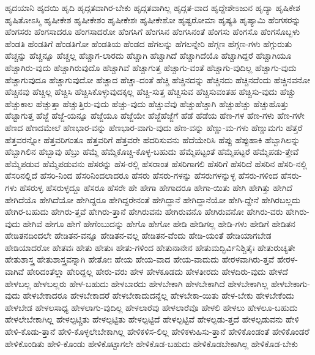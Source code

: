 {ಹೃದಯಾನಿ
ಹೃದಯಿ
ಹೃದಿ
ಹೃದ್ಗತವಾಗಿರ-ಬೇಕು
ಹೃದ್ಗತವಾಗಿಲ್ಲ
ಹೃದ್ಗತ-ವಾದ
ಹೃದ್ದೇಶೇಽಜುನ
ಹೃದ್ಯಾ
ಹೃಷಿಕೇಶ
ಹೃಷಿತೋಽಸ್ಮಿ
ಹೃಷೀಕೇಶ
ಹೃಷೀಕೇಶಂ
ಹೃಷೀಕೇಶಃ
ಹೃಷೀಕೇಶೋ
ಹೃಷ್ಟರೋಮಾ
ಹೃಷ್ಯತಿ
ಹೃಷ್ಯಾಮಿ
ಹೆಂಗಸರನ್ನು
ಹೆಂಗಸರು
ಹೆಂಗಸಾದರೂ
ಹೆಂಗಸಾದರೋ
ಹೆಂಗಸಿಗೆ
ಹೆಂಗಸಿನ
ಹೆಂಗಸಿನಂತೆ
ಹೆಂಗಸು
ಹೆಂಗಸೊ
ಹೆಂಗಸೊಬ್ಬಳು
ಹೆಂಡತಿ
ಹೆಂಡತಿಗೆ
ಹೆಂಡತಿಗೋ
ಹೆಂಡತಿಯ
ಹೆಂಡದ
ಹೆಗಲನ್ನು
ಹೆಗಲನ್ನೇರಿ
ಹೆಗ್ಗಣ
ಹೆಗ್ಗಣ-ಗಳು
ಹೆಗ್ಗುರುತು
ಹೆಚ್ಚನ್ನು
ಹೆಚ್ಚನ್ನೂ
ಹೆಚ್ಚಲ್ಲ
ಹೆಚ್ಚಾಗ-ಲಾರದು
ಹೆಚ್ಚಾಗಿ
ಹೆಚ್ಚಾಗಿದೆ
ಹೆಚ್ಚಾಗಿದೆಯೊ
ಹೆಚ್ಚಾಗಿದ್ದರೆ
ಹೆಚ್ಚಾಗಿಯೂ
ಹೆಚ್ಚಾಗಿರು-ವುದು
ಹೆಚ್ಚಾಗಿರುವುದೊ
ಹೆಚ್ಚಾಗಿವೆ
ಹೆಚ್ಚಾಗುತ್ತ
ಹೆಚ್ಚಾಗು-ವಂತೆ
ಹೆಚ್ಚಾಗು-ವುದಿಲ್ಲ
ಹೆಚ್ಚಾಗು-ವುದು
ಹೆಚ್ಚಾಗುವುದೂ
ಹೆಚ್ಚಾಗುವುದೋ
ಹೆಚ್ಚಾದ
ಹೆಚ್ಚಾ-ದಂತೆ
ಹೆಚ್ಚಿ
ಹೆಚ್ಚಿನದನ್ನು
ಹೆಚ್ಚಿನದು
ಹೆಚ್ಚಿನದೆಂದು
ಹೆಚ್ಚಿನವನೋ
ಹೆಚ್ಚಿನವು
ಹೆಚ್ಚಿಲ್ಲ
ಹೆಚ್ಚಿಸಿ
ಹೆಚ್ಚಿಸಿಕೊಳ್ಳುವುದಕ್ಕಲ್ಲ
ಹೆಚ್ಚಿ-ಸುತ್ತ
ಹೆಚ್ಚಿಸುವ
ಹೆಚ್ಚಿಸುವಂತಹ
ಹೆಚ್ಚಿಸು-ವುದು
ಹೆಚ್ಚು
ಹೆಚ್ಚುಕಾಲ
ಹೆಚ್ಚುತ್ತಾ
ಹೆಚ್ಚುತ್ತಿರು-ವುದು
ಹೆಚ್ಚು-ವುದು
ಹೆಚ್ಚುವೆವು
ಹೆಚ್ಚುಹೆಚ್ಚಾಗಿ
ಹೆಚ್ಚುಹೆಚ್ಚು
ಹೆಚ್ಚುಹೊತ್ತು
ಹೆಚ್ಟಾಗುತ್ತ
ಹೆಜ್ಜೆ
ಹೆಜ್ಜೆ-ಯನ್ನೂ
ಹೆಜ್ಜೆಯೂ
ಹೆಜ್ಜೆಯೇ
ಹೆಜ್ಜೆಹೆಜ್ಜೆಗೆ
ಹೆಡೆ
ಹೆಡೆಯ
ಹೆಣ-ಗಳ
ಹೆಣ-ಗಳು
ಹೆಣ-ಗಳೇ
ಹೆಣದ
ಹೆಣದಮೇಲೆ
ಹೆಣಭಾರ-ವನ್ನು
ಹೆಣಭಾರ-ವಾಗು-ವುದು
ಹೆಣ-ವನ್ನು
ಹೆಣ್ಣು-ಮ-ಗಳು
ಹೆಣ್ಣುಮಗು
ಹೆತ್ತರೆ
ಹೆತ್ತವರನ್ನೋ
ಹೆತ್ತವರಿಗಂತೂ
ಹೆತ್ತವರಿಗೆ
ಹೆತ್ತವರೇ
ಹೆದರಿಸುವನು
ಹೆದೆಯೇರಿಸಿ
ಹೆಪ್ಪು
ಹೆಪ್ಪುಹಾಕಿ
ಹೆಬ್ಬಾಗಿಲನ್ನು
ಹೆಬ್ಬಾಗಿಲಿನ
ಹೆಬ್ಬಾವು
ಹೆಬ್ರು
ಹೆಮ್ಮೆ
ಹೆಮ್ಮೆಕೊಚ್ಚಿ-ಕೊಳ್ಳ-ಬಹುದು
ಹೆಮ್ಮೆಪಟ್ಟಂತೆ
ಹೆಮ್ಮೆಪಟ್ಟರೆ
ಹೆಮ್ಮೆಪಡು-ತ್ತೇವೆ
ಹೆಮ್ಮೆಪಡುವ
ಹೆಮ್ಮೆಪಡುವನು
ಹೆಸರನ್ನು
ಹೆಸ-ರಲ್ಲಿ
ಹೆಸರಾಂತ
ಹೆಸರಿಗಾಗಲಿ
ಹೆಸರಿಗೆ
ಹೆಸರಿದೆ
ಹೆಸರಿನ
ಹೆಸರಿ-ನಲ್ಲಿ
ಹೆಸರಿನಲ್ಲಿದೆ
ಹೆಸರಿ-ನಿಂದ
ಹೆಸರಿನಿಂದಲಾದರೂ
ಹೆಸರು
ಹೆಸರು-ಗಳನ್ನು
ಹೆಸರುಗಳನ್ನುಳ್ಳ
ಹೆಸರು-ಗಳಿಂದ
ಹೆಸರು-ಗಳು
ಹೆಸರುಳ್ಳ
ಹೆಸರುಳ್ಳದ್ದೂ
ಹೆಸರೂ
ಹೆಸರೇ
ಹೇ
ಹೇಗಾ
ಹೇಗಾದರೂ
ಹೇಗಾ-ಯಿತು
ಹೇಗಿ
ಹೇಗಿತ್ತು
ಹೇಗಿದೆ
ಹೇಗಿದೆಯೊ
ಹೇಗಿದೆಯೋ
ಹೇಗಿದ್ದರೂ
ಹೇಗಿದ್ದರೇನಂತೆ
ಹೇಗಿದ್ದಾನೆ
ಹೇಗಿದ್ದಾನೆಯೋ
ಹೇಗಿ-ದ್ದೇನೆ
ಹೇಗಿರಬಲ್ಲದು
ಹೇಗಿರ-ಬಹುದು
ಹೇಗಿರು-ತ್ತವೆ
ಹೇಗಿರು-ತ್ತಾನೆ
ಹೇಗಿರುವನು
ಹೇಗಿರುವನೊ
ಹೇಗಿರುವನೋ
ಹೇಗಿರು-ವರು
ಹೇಗಿರು-ವುದು
ಹೇಗಿವೆ
ಹೇಗೂ
ಹೇಗೆ
ಹೇಗೆಂಬುದನ್ನು
ಹೇಗೊ
ಹೇಗೋ
ಹೇಡಿ
ಹೇಡಿಗಲ್ಲ
ಹೇಡಿ-ಗಳು
ಹೇಡಿಗೆ
ಹೇಡಿತನ
ಹೇಡಿತನದಿಂದಲೇ
ಹೇಡಿತನ-ವನ್ನೂ
ಹೇಡಿತನ-ವಲ್ಲ
ಹೇಡಿತನ-ವೆಂದು
ಹೇಡಿ-ಯಂತೆ
ಹೇಡಿಯಾಗಬೇಡ
ಹೇಡಿಯಾದರೋ
ಹೇತವಃ
ಹೇತು
ಹೇತುಃ
ಹೇತು-ಗಳಿಂದ
ಹೇತುನಾನೇನ
ಹೇತುಮದ್ಭಿರ್ವಿನಿಶ್ಚಿತೈಃ
ಹೇತುರುಚ್ಯತೇ
ಹೇತುಶಾಸ್ತ್ರ
ಹೇತುಶಾಸ್ತ್ರವನ್ನಾಗಿ
ಹೇತೋಃ
ಹೇಯ
ಹೇಯ-ವಾದ
ಹೇಯ-ವಾದುದು
ಹೇರಳವಾಗಿರು-ತ್ತವೆ
ಹೇರಳ-ವಾಗಿವೆ
ಹೇರಿದಂತೆಲ್ಲಾ
ಹೇರಿದ್ದಲ್ಲ
ಹೇರು-ವರು
ಹೇಳ
ಹೇಳಕೂಡದು
ಹೇಳತೀರದು
ಹೇಳದಿರು-ವುದು
ಹೇಳದೆ
ಹೇಳಬಲ್ಲ
ಹೇಳಬಲ್ಲರು
ಹೇಳ-ಬಹುದು
ಹೇಳಬಾರದು
ಹೇಳಬೇಕಾಗಿ
ಹೇಳಬೇಕಾಗಿದೆ
ಹೇಳಬೇಕಾಗಿಲ್ಲ
ಹೇಳಬೇಕಾಗು-ವುದು
ಹೇಳಬೇಕಾದರೂ
ಹೇಳಬೇಕಾದರೆ
ಹೇಳಬೇಕಾದುದನ್ನೆಲ್ಲ
ಹೇಳಬೇಕಾ-ಯಿತು
ಹೇಳ-ಬೇಕು
ಹೇಳಬೇಕೆಂದು
ಹೇಳಬೇಡ
ಹೇಳಲಸಾಧ್ಯ
ಹೇಳಲಾಗು-ವುದಿಲ್ಲ
ಹೇಳಲಾರೆವು
ಹೇಳಲಾರೆವೊ
ಹೇಳಲಿ
ಹೇಳಲು
ಹೇಳಲೂ-ಬಹುದು
ಹೇಳಲೇಬೇಕಾಗಿಲ್ಲ
ಹೇಳಲ್ಪಟ್ಚಿತು
ಹೇಳಲ್ಪಟ್ಟಿತು
ಹೇಳಲ್ಪಟ್ಟಿದೆ
ಹೇಳಲ್ಪಟ್ಟಿವೆ
ಹೇಳಲ್ಪಡು-ತ್ತದೆ
ಹೇಳಲ್ಪಡುವನು
ಹೇಳಿ
ಹೇಳಿ-ಕೊಡು-ತ್ತಾನೆ
ಹೇಳಿ-ಕೊಳ್ಳಲೇಬೇಕಾಗಿಲ್ಲ
ಹೇಳಿಕಳಿಸ-ಲಿಲ್ಲ
ಹೇಳಿಕಳುಹಿಸು-ತ್ತಾನೆ
ಹೇಳಿಕೊಂಡಂತೆ
ಹೇಳಿಕೊಂಡರೆ
ಹೇಳಿಕೊಂಡಿತು
ಹೇಳಿ-ಕೊಂಡು
ಹೇಳಿಕೊಟ್ಟಾಗಲೇ
ಹೇಳಿಕೊಡ-ಬಹುದು
ಹೇಳಿಕೊಡಬೇಕಾಗಿಲ್ಲ
ಹೇಳಿಕೊಡ-ಬೇಕು
}
